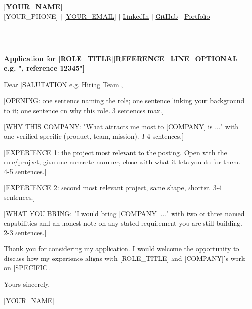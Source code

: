 \documentclass[letterpaper,11pt]{article}
\begin{document}
\begin{center}
    \textbf{\Huge \scshape [YOUR_NAME]} \\ \vspace{3pt}
    \small [YOUR_PHONE] $|$ \href{mailto:[YOUR_EMAIL]}{\underline{[YOUR_EMAIL]}} $|$
    \href{[YOUR_LINKEDIN_URL]}{\underline{LinkedIn}} $|$
    \href{[YOUR_GITHUB_URL]}{\underline{GitHub}} $|$
    \href{[YOUR_PORTFOLIO_URL]}{\underline{Portfolio}}
\end{center}
\vspace{2pt}\hrule\vspace{10pt}


 \\
[COMPANY] \\
[COMPANY_CITY]

\vspace{6pt}
\noindent\textbf{Application for [ROLE_TITLE][REFERENCE_LINE_OPTIONAL e.g. ", reference 12345"]}

\vspace{4pt}
Dear [SALUTATION e.g. Hiring Team],

[OPENING: one sentence naming the role; one sentence linking your background to it; one sentence on why this role. 3 sentences max.]

[WHY THIS COMPANY: "What attracts me most to [COMPANY] is ..." with one verified specific (product, team, mission). 3-4 sentences.]

[EXPERIENCE 1: the project most relevant to the posting. Open with the role/project, give one concrete number, close with what it lets you do for them. 4-5 sentences.]

[EXPERIENCE 2: second most relevant project, same shape, shorter. 3-4 sentences.]

[WHAT YOU BRING: "I would bring [COMPANY] ..." with two or three named capabilities and an honest note on any stated requirement you are still building. 2-3 sentences.]

Thank you for considering my application. I would welcome the opportunity to discuss how my experience aligns with [ROLE_TITLE] and [COMPANY]'s work on [SPECIFIC].

\vspace{8pt}
Yours sincerely,

\vspace{14pt}
[YOUR_NAME]
\end{document}
